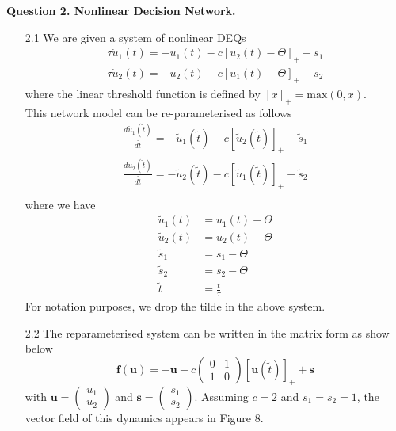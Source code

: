 \documentclass[12pt]{article}
\begin{document}
\newpage
\noindent\textbf{Question 2. Nonlinear Decision Network.}
\begin{enumerate}
    \item[2.1] We are given a system of nonlinear DEQs
\begin{align*}
    \tau \dot{u}_{1}(t) = -u_{1}(t) -c[u_{2}(t) -\Theta]_{+} + s_{1}\\
    \tau \dot{u}_{2}(t) = -u_{2}(t) -c[u_{1}(t) -\Theta]_{+} + s_{2}
\end{align*}
where the linear threshold function is defined by $[x]_{+}=\text{max}(0, x)$.\\
This network model can be re-parameterised as follows
\begin{align*}
    \frac{d\tilde{u}_{1}(\tilde{t})}{d\tilde{t}} = -\tilde{u}_{1}(\tilde{t}) -c[\tilde{u}_{2}(\tilde{t})]_{+} + \tilde{s}_{1}\\
    \frac{d\tilde{u}_{2}(\tilde{t})}{d\tilde{t}} = -\tilde{u}_{2}(\tilde{t}) -c[\tilde{u}_{1}(\tilde{t})]_{+} + \tilde{s}_{2}\\
\end{align*}
where we have 
\begin{align*}
    \tilde{u}_{1}(t) &= u_{1}(t) - \Theta\\
    \tilde{u}_{2}(t) &= u_{2}(t) - \Theta\\
    \tilde{s}_{1} &= s_{1} - \Theta\\
    \tilde{s}_{2} &= s_{2} - \Theta\\
    \tilde{t} &= \frac{t}{\tau}
\end{align*}
For notation purposes, we drop the tilde in the above system.
\item[2.2] The reparameterised system can be written in the matrix form as show below
\[
\mathbf{f}(\mathbf{u}) = -\mathbf{u} - c\begin{pmatrix}0 & 1\\ 1 & 0\end{pmatrix} [\mathbf{u}(\tilde{t})]_{+} + \mathbf{s}
\] 
with $\mathbf{u}=\begin{pmatrix}u_{1}\\ u_{2}\end{pmatrix}$ and $\mathbf{s}=\begin{pmatrix}s_{1}\\ s_{2}\end{pmatrix}$. Assuming $c=2$ and $s_{1}=s_{2}=1$, the vector 
field of this dynamics appears in Figure 8.


\end{enumerate}
\end{document}
